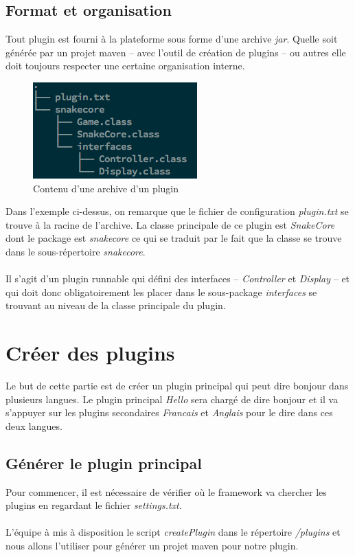 \documentclass[12pt,a4paper]{article}
\begin{document}
\subsection{Format et organisation}
Tout plugin est fourni à la plateforme sous forme d'une archive \emph{jar}. Quelle 
soit générée par un projet maven -- avec l'outil de création de plugins -- ou autres 
elle doit toujours respecter une certaine organisation interne.

\begin{figure}[h]
   \centering
   \includegraphics{ressources/plugin-organization.png}
   \caption{Contenu d'une archive d'un plugin}
\end{figure}

Dans l'exemple ci-dessus, on remarque que le fichier de configuration 
\emph{plugin.txt} se trouve à la racine de l'archive. La classe principale de ce 
plugin est \emph{SnakeCore} dont le package est \emph{snakecore} ce qui se traduit 
par le fait que la classe se trouve dans le sous-répertoire \emph{snakecore}.
\\\\
Il s'agit d'un plugin runnable qui défini des interfaces -- \emph{Controller} et 
\emph{Display} -- et qui doit donc obligatoirement les placer dans le sous-package 
\emph{interfaces} se trouvant au niveau de la classe principale du plugin.

\section{Créer des plugins}
Le but de cette partie est de créer un plugin principal qui peut dire bonjour dans 
plusieurs langues. Le plugin principal \emph{Hello} sera chargé de dire bonjour et 
il va s'appuyer sur les plugins secondaires \emph{Francais} et \emph{Anglais} pour 
le dire dans ces deux langues.

\subsection{Générer le plugin principal}
Pour commencer, il est nécessaire de vérifier où le framework va chercher les 
plugins en regardant le fichier \emph{settings.txt}.
\\\\
L'équipe à mis à disposition le script \emph{createPlugin} dans le répertoire 
\emph{/plugins} et nous allons l'utiliser pour générer un projet maven pour notre 
plugin.
\end{document}

